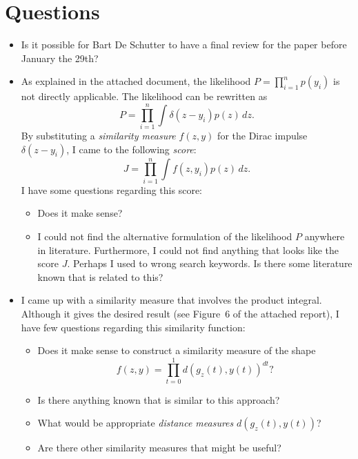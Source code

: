 \documentclass[10pt,final,a4paper,oneside,onecolumn]{article}
\begin{document}
\section{Questions}
\begin{itemize}
	\item Is it possible for Bart De Schutter to have a final review for the paper before January the 29th?
	\item As explained in the attached document, the likelihood $P=\prod_{i=1}^n p(y_i)$ is not directly applicable. The likelihood can be rewritten as
	\begin{equation*}
		P = \prod_{i=1}^n \int \delta(z - y_i) p(z) \,dz.
	\end{equation*}
	By substituting a \emph{similarity measure} $f(z,y)$ for the Dirac impulse $\delta(z - y_i)$, I came to the following \emph{score}:
	\begin{equation*}
		J = \prod_{i=1}^n \int f(z,y_i)p(z) \,dz.
	\end{equation*}
	I have some questions regarding this score:
	\begin{itemize}
		\item Does it make sense?
		\item I could not find the alternative formulation of the likelihood $P$ anywhere in literature. Furthermore, I could not find anything that looks like the score $J$. Perhaps I used to wrong search keywords. Is there some literature known that is related to this?
	\end{itemize}
	\item I came up with a similarity measure that involves the product integral. Although it gives the desired result (see Figure~6 of the attached report), I have few questions regarding this similarity function:
	\begin{itemize}
		\item Does it make sense to construct a similarity measure of the shape
		\begin{equation*}
			f(z,y) = \prod_{t=0}^{1} d(g_z(t), y(t))^{dt}?
		\end{equation*}
		\item Is there anything known that is similar to this approach?
		\item What would be appropriate \emph{distance measures} $d(g_z(t), y(t))$?
		\item Are there other similarity measures that might be useful?
	\end{itemize}
\end{itemize}






\end{document}
